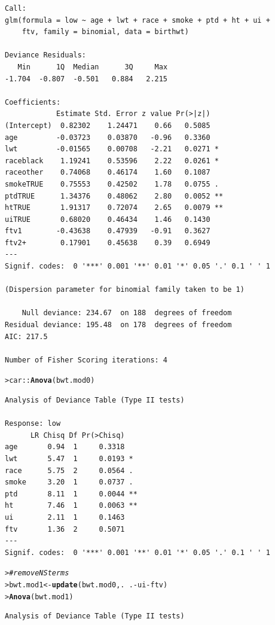 \documentclass[10pt]{report}\usepackage[]{graphicx}\usepackage[]{color}
\makeatletter
\newcommand{\hlcom}[1]{\textcolor[rgb]{0.678,0.584,0.686}{\textit{#1}}}%
\newcommand{\hlopt}[1]{\textcolor[rgb]{0,0,0}{#1}}%
\newcommand{\hlstd}[1]{\textcolor[rgb]{0.345,0.345,0.345}{#1}}%
\newcommand{\hlkwb}[1]{\textcolor[rgb]{0.69,0.353,0.396}{#1}}%
\newcommand{\hlkwd}[1]{\textcolor[rgb]{0.737,0.353,0.396}{\textbf{#1}}}%
\newenvironment{kframe}{%
 \def\at@end@of@kframe{}%
 \ifinner\ifhmode%
  \def\at@end@of@kframe{\end{minipage}}%
  \begin{minipage}{\columnwidth}%
 \fi\fi%
 \def\FrameCommand##1{\hskip\@totalleftmargin \hskip-\fboxsep
 \colorbox{shadecolor}{##1}\hskip-\fboxsep
     \hskip-\linewidth \hskip-\@totalleftmargin \hskip\columnwidth}%
 \MakeFramed {\advance\hsize-\width
   \@totalleftmargin\z@ \linewidth\hsize
   \@setminipage}}%
 {\par\unskip\endMakeFramed%
 \at@end@of@kframe}
\newenvironment{knitrout}{}{} %
\renewenvironment{knitrout}{\small\renewcommand{\baselinestretch}{.85}}{} %
\makeatother
\begin{document}
\begin{Exercises}
\begin{enumerate*}
\begin{ans}
\begin{knitrout}
\begin{kframe}
\begin{verbatim}
Call:
glm(formula = low ~ age + lwt + race + smoke + ptd + ht + ui + 
    ftv, family = binomial, data = birthwt)

Deviance Residuals: 
   Min      1Q  Median      3Q     Max  
-1.704  -0.807  -0.501   0.884   2.215  

Coefficients:
            Estimate Std. Error z value Pr(>|z|)   
(Intercept)  0.82302    1.24471    0.66   0.5085   
age         -0.03723    0.03870   -0.96   0.3360   
lwt         -0.01565    0.00708   -2.21   0.0271 * 
raceblack    1.19241    0.53596    2.22   0.0261 * 
raceother    0.74068    0.46174    1.60   0.1087   
smokeTRUE    0.75553    0.42502    1.78   0.0755 . 
ptdTRUE      1.34376    0.48062    2.80   0.0052 **
htTRUE       1.91317    0.72074    2.65   0.0079 **
uiTRUE       0.68020    0.46434    1.46   0.1430   
ftv1        -0.43638    0.47939   -0.91   0.3627   
ftv2+        0.17901    0.45638    0.39   0.6949   
---
Signif. codes:  0 '***' 0.001 '**' 0.01 '*' 0.05 '.' 0.1 ' ' 1

(Dispersion parameter for binomial family taken to be 1)

    Null deviance: 234.67  on 188  degrees of freedom
Residual deviance: 195.48  on 178  degrees of freedom
AIC: 217.5

Number of Fisher Scoring iterations: 4
\end{verbatim}
\begin{alltt}
\hlstd{> }\hlstd{car}\hlopt{::}\hlkwd{Anova}\hlstd{(bwt.mod0)}
\end{alltt}
\begin{verbatim}
Analysis of Deviance Table (Type II tests)

Response: low
      LR Chisq Df Pr(>Chisq)   
age       0.94  1     0.3318   
lwt       5.47  1     0.0193 * 
race      5.75  2     0.0564 . 
smoke     3.20  1     0.0737 . 
ptd       8.11  1     0.0044 **
ht        7.46  1     0.0063 **
ui        2.11  1     0.1463   
ftv       1.36  2     0.5071   
---
Signif. codes:  0 '***' 0.001 '**' 0.01 '*' 0.05 '.' 0.1 ' ' 1
\end{verbatim}
\begin{alltt}
\hlstd{> }  \hlcom{# remove NS terms}
\hlstd{> }\hlstd{bwt.mod1} \hlkwb{<-} \hlkwd{update}\hlstd{(bwt.mod0, .} \hlopt{~} \hlstd{.} \hlopt{-} \hlstd{ui} \hlopt{-} \hlstd{ftv)}
\hlstd{> }\hlkwd{Anova}\hlstd{(bwt.mod1)}
\end{alltt}
\begin{verbatim}
Analysis of Deviance Table (Type II tests)


\end{verbatim}
\end{kframe}
\end{knitrout}
\end{ans}
\end{enumerate*}
\end{Exercises}
\end{document}

